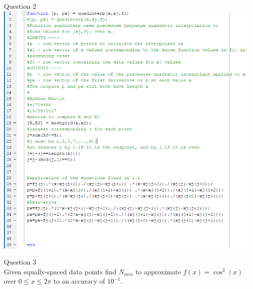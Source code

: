 \documentclass[a4paper]{article}
\begin{document}
	\newpage
	Question 2\\
	\includegraphics{quadinterp.PNG}
	
	
	
	
	\newpage
	Question 3\\
	Given equally-spaced data points find $N_{min}$ to approximate $f(x)=\cos^2(x)$ over $0\leq x\leq 2\pi$ to an accuracy of $10^{-1}$.
	
\end{document}
